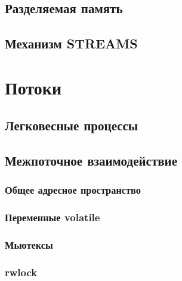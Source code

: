 \documentclass[oneside]{book}
\begin{document}
		\section{Разделяемая память}
			

		\section{Механизм STREAMS}
			

	\chapter{Потоки}
	

		\section{Легковесные процессы}
		

		\section{Межпоточное взаимодействие}
			
		
			\subsection{Общее адресное пространство}
				
		
			\subsection{Переменные volatile}
					
	
			\subsection{Мьютексы}
				
			
			\subsection{rwlock}
				
		
		
		

	
\end{document}
